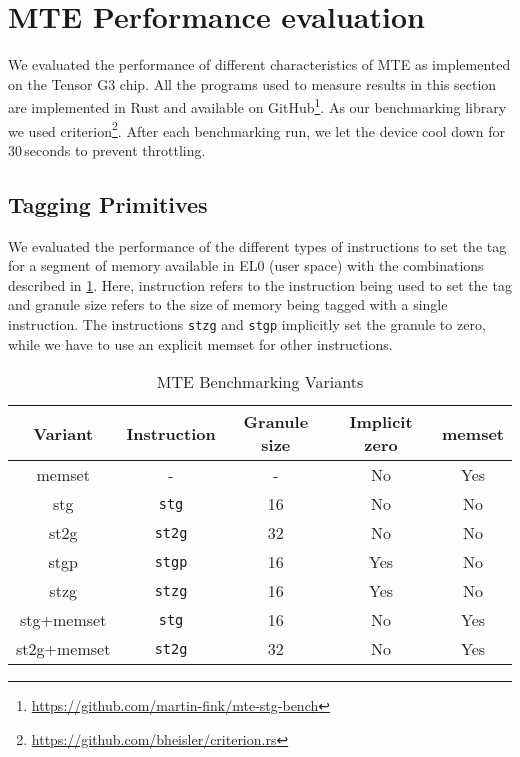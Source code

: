 \section{MTE Performance evaluation}
\label{sec:mte-performance-evaluation}

We evaluated the performance of different characteristics of \ac{MTE} as implemented on the Tensor G3 chip.
All the programs used to measure results in this section are implemented in Rust and available on GitHub\footnote{\url{https://github.com/martin-fink/mte-stg-bench}}.
As our benchmarking library we used criterion\footnote{\url{https://github.com/bheisler/criterion.rs}}.
After each benchmarking run, we let the device cool down for 30\,seconds to prevent throttling.

\subsection{Tagging Primitives}
\label{subsec:tagging-primitives}

We evaluated the performance of the different types of instructions to set the tag for a segment of memory available in EL0 (user space) with the combinations described in \cref{tab:stg-instructions}.
Here, instruction refers to the instruction being used to set the tag and granule size refers to the size of memory being tagged with a single instruction.
The instructions \texttt{stzg} and \texttt{stgp} implicitly set the granule to zero, while we have to use an explicit memset for other instructions.

\begin{table}[h]
    \centering
    \small
    \begin{tabular}{c || c | c |  c | c }
        \textbf{Variant} & \textbf{Instruction} & \textbf{Granule size} & \textbf{Implicit zero} & \textbf{memset} \\
        \hline
        memset      & -             & -  & No  & Yes \\
        stg         & \texttt{stg}  & 16 & No  & No  \\
        st2g        & \texttt{st2g} & 32 & No  & No  \\
        stgp        & \texttt{stgp} & 16 & Yes & No  \\
        stzg        & \texttt{stzg} & 16 & Yes & No  \\
        stg+memset  & \texttt{stg}  & 16 & No  & Yes \\
        st2g+memset & \texttt{st2g} & 32 & No  & Yes \\
    \end{tabular}
    \caption{MTE Benchmarking Variants}
    \label{tab:stg-instructions}
\end{table}

